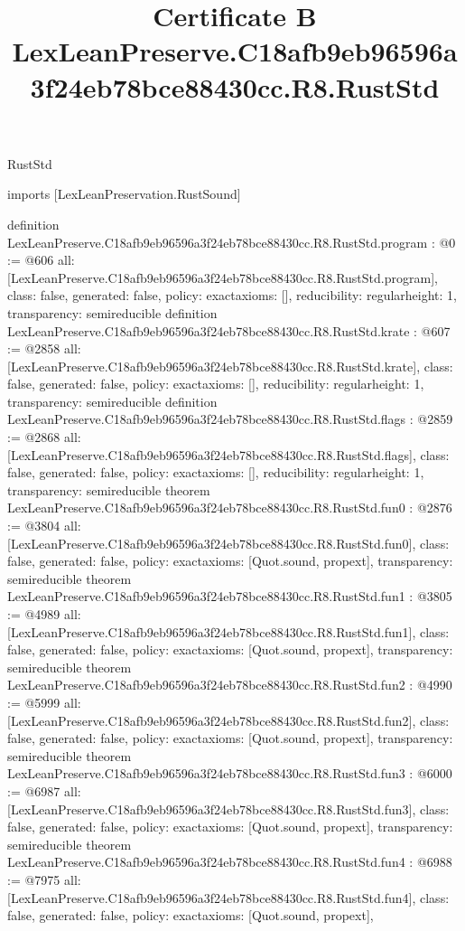 \begin{lexlean}{RustStd}
\title{Certificate B LexLeanPreserve.C18afb9eb96596a3f24eb78bce88430cc.R8.RustStd}
\begin{coremodule}
imports [LexLeanPreservation.RustSound]

definition LexLeanPreserve.C18afb9eb96596a3f24eb78bce88430cc.R8.RustStd.program : @0 := @606 {
  all: [LexLeanPreserve.C18afb9eb96596a3f24eb78bce88430cc.R8.RustStd.program],
  class: false,
  generated: false,
  policy: exact{axioms: []},
  reducibility: regular{height: 1},
  transparency: semireducible
}
definition LexLeanPreserve.C18afb9eb96596a3f24eb78bce88430cc.R8.RustStd.krate : @607 := @2858 {
  all: [LexLeanPreserve.C18afb9eb96596a3f24eb78bce88430cc.R8.RustStd.krate],
  class: false,
  generated: false,
  policy: exact{axioms: []},
  reducibility: regular{height: 1},
  transparency: semireducible
}
definition LexLeanPreserve.C18afb9eb96596a3f24eb78bce88430cc.R8.RustStd.flags : @2859 := @2868 {
  all: [LexLeanPreserve.C18afb9eb96596a3f24eb78bce88430cc.R8.RustStd.flags],
  class: false,
  generated: false,
  policy: exact{axioms: []},
  reducibility: regular{height: 1},
  transparency: semireducible
}
theorem LexLeanPreserve.C18afb9eb96596a3f24eb78bce88430cc.R8.RustStd.fun0 : @2876 := @3804 {
  all: [LexLeanPreserve.C18afb9eb96596a3f24eb78bce88430cc.R8.RustStd.fun0],
  class: false,
  generated: false,
  policy: exact{axioms: [Quot.sound, propext]},
  transparency: semireducible
}
theorem LexLeanPreserve.C18afb9eb96596a3f24eb78bce88430cc.R8.RustStd.fun1 : @3805 := @4989 {
  all: [LexLeanPreserve.C18afb9eb96596a3f24eb78bce88430cc.R8.RustStd.fun1],
  class: false,
  generated: false,
  policy: exact{axioms: [Quot.sound, propext]},
  transparency: semireducible
}
theorem LexLeanPreserve.C18afb9eb96596a3f24eb78bce88430cc.R8.RustStd.fun2 : @4990 := @5999 {
  all: [LexLeanPreserve.C18afb9eb96596a3f24eb78bce88430cc.R8.RustStd.fun2],
  class: false,
  generated: false,
  policy: exact{axioms: [Quot.sound, propext]},
  transparency: semireducible
}
theorem LexLeanPreserve.C18afb9eb96596a3f24eb78bce88430cc.R8.RustStd.fun3 : @6000 := @6987 {
  all: [LexLeanPreserve.C18afb9eb96596a3f24eb78bce88430cc.R8.RustStd.fun3],
  class: false,
  generated: false,
  policy: exact{axioms: [Quot.sound, propext]},
  transparency: semireducible
}
theorem LexLeanPreserve.C18afb9eb96596a3f24eb78bce88430cc.R8.RustStd.fun4 : @6988 := @7975 {
  all: [LexLeanPreserve.C18afb9eb96596a3f24eb78bce88430cc.R8.RustStd.fun4],
  class: false,
  generated: false,
  policy: exact{axioms: [Quot.sound, propext]},
}
\end{coremodule}
\end{lexlean}
